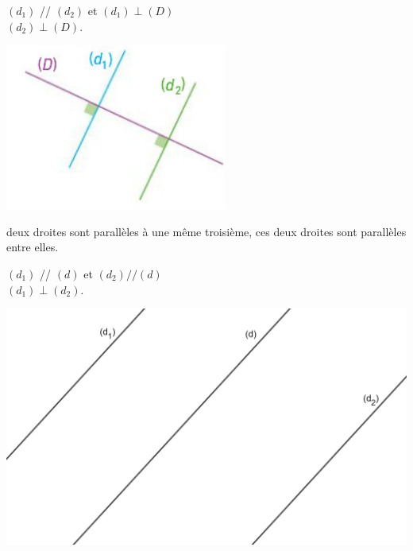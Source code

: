 \begin{myex}
	\begin{multicols}{2}
		 $(d_1)$ // $(d_2)$ et $(d_1) \perp (D)$\\
		 $(d_2) \perp (D)$.
		
		\includegraphics[scale=0.6]{img/para2}
	\end{multicols}
	
\end{myex}

\begin{myprop}
	 deux droites sont parallèles à une même troisième,  ces deux droites sont parallèles entre elles.
\end{myprop}

\begin{myex}
	\begin{multicols}{2}
		 $(d_1)$ // $(d)$ et $(d_2) // (d)$\\
		 $(d_1) \perp (d_2)$.
		
		\includegraphics[scale=0.1]{img/para3}
	\end{multicols}
	
\end{myex}
